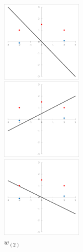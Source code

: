 \begin{figure}[H]
    \begin{minipage}{0.3\hsize}
        \begin{center}
            \includegraphics[width=40mm]{./figures/section_2/image0.eps}
            \captionsetup{labelformat=empty,labelsep=none}
            \caption{$w_{(0)}$}
        \end{center}
    \end{minipage}
    \begin{minipage}{0.3\hsize}
        \begin{center}
            \includegraphics[width=40mm]{./figures/section_2/image1.eps}
            \captionsetup{labelformat=empty,labelsep=none}
            \caption{$w_{(1)}$}
        \end{center}
    \end{minipage}
    \begin{minipage}{0.3\hsize}
        \begin{center}
            \includegraphics[width=40mm]{./figures/section_2/image2.eps}
            \captionsetup{labelformat=empty,labelsep=none}
            \caption{$w_{(2)}$}
        \end{center}
    \end{minipage}
\end{figure}
